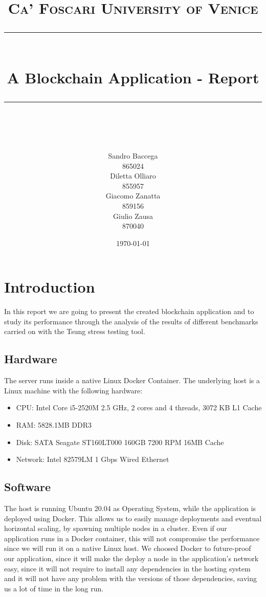 \documentclass[11pt]{scrartcl} %
\title{	
	\normalfont\normalsize
	\textsc{Ca' Foscari University of Venice}\\ %
	\vspace{25pt} %
	\rule{\linewidth}{0.5pt}\\ %
	\vspace{20pt} %
	{\huge A Blockchain Application - Report}\\ %
	\vspace{12pt} %
	\rule{\linewidth}{2pt}\\ %
	\vspace{12pt} %
}
\author{\hspace{-0.8cm} \parbox{4cm}{\centering
  Sandro Baccega\\ 865024} \parbox{4cm}{\centering
  Diletta Olliaro\\ 855957} \parbox{4cm}{\centering
  Giacomo Zanatta\\ 859156} \parbox{4cm}{\centering Giulio Zausa\\ 870040} } %
\date{\vspace{20pt}\today} %
\begin{document}
\maketitle %



\section{Introduction}

In this report we are going to present the created blockchain application and to study its performance through the analysis of the results of different benchmarks carried on with the Tsung stress testing tool.

\subsection{Hardware}
The server runs inside a native Linux Docker Container. The underlying host is a Linux machine with the following hardware:
\begin{itemize}
\item[\adforn{43}] CPU: Intel Core i5-2520M 2.5 GHz, 2 cores and 4 threads, 3072 KB L1 Cache
\item[\adforn{43}] RAM: 5828.1MB DDR3
\item[\adforn{43}] Disk: SATA Seagate ST160LT000 160GB 7200 RPM 16MB Cache
\item[\adforn{43}] Network: Intel 82579LM 1 Gbps Wired Ethernet
\end{itemize}

\subsection{Software}

The host is running Ubuntu 20.04 as Operating System, while the application is deployed using Docker. 
This allows us to easily manage deployments and eventual horizontal scaling, by spawning multiple nodes in a cluster. 
Even if our application runs in a Docker container, this will not compromise the performance since we will run it on a native Linux host. 
We choosed Docker to future-proof our application, since it will make the deploy a node in the application's network easy, since it will not require to install any dependencies in the hosting system and it will not have any problem with the versions of those dependencies, saving us a lot of time in the long run.
\end{document}
